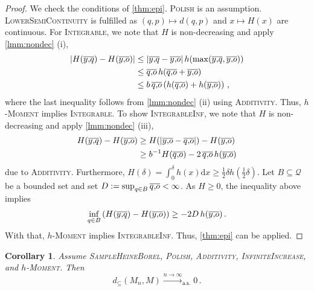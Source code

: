 \documentclass{scrartcl}
\renewcommand{\subset}{\subseteq}
\newcommand*{\mc}[1]{\mathcal{#1}}
\newcommand*{\ms}[1]{\mathsf{#1}}
\newcommand{\dl}{\mathrm{d}}
\newcommand{\equationFullstop}{\, .}
\newcommand{\eqfs}{\equationFullstop}
\newcommand{\equationComma}{\, ,}
\newcommand{\eqcm}{\equationComma}
\theoremstyle{plain}\newtheorem{theorem}{Theorem}[section]
\newtheorem{corollary}[theorem]{Corollary}
\theoremstyle{definition}
\theoremstyle{remark}
\begin{document}
\begin{proof}
	We check the conditions of \autoref{thm:epi}. \textsc{Polish} is an assumption. 
	\textsc{LowerSemiContinuity} is fulfilled as $(q,p)\mapsto d(q,p)$ and $x \mapsto H(x)$ are continuous.
	For \textsc{Integrable}, we note that $H$ is non-decreasing and apply \autoref{lmm:nondec} (i),
	\begin{align*}
		\abs{H(\ol yq) - H(\ol yo)} 
		&\leq 
		\abs{\ol yq - \ol yo} h\brOf{\max(\ol yq, \ol yo)}
		\\&\leq 
		\ol qo\, h(\ol qo + \ol yo)
		\\&\leq 
		b\, \ol qo \br{h(\ol qo) + h(\ol yo)}
		\eqcm
	\end{align*}
	where the last inequality follows from \autoref{lmm:nondec} (ii) using \textsc{Additivity}.
	Thus, \textsc{$h$-Moment} implies \textsc{Integrable}.
	To show \textsc{IntegrableInf}, we note that $H$ is non-decreasing and apply \autoref{lmm:nondec} (iii),
	\begin{align*}
		H(\ol yq) - H(\ol yo)
		&\geq 
		H(\abs{\ol yo - \ol qo}) - H(\ol yo)
		\\&\geq 
		b^{-1} H( \ol qo) - 2  \,\ol qo\, h( \ol yo)
	\end{align*}
	due to \textsc{Additivity}. Furthermore, $H(\delta)  = \int_0^\delta h(x) \dl x \geq \frac12 \delta h(\frac12 \delta)$.
	Let $B \subset \mc Q$ be a bounded set and set $D := \sup_{q\in B} \overline{q,\!o} < \infty$. As $H \geq 0$, the inequality above implies
	\begin{equation*}
		\inf_{q \in B} \br{H(\ol yq) - H(\ol yo)} \geq - 2 D\, h(\ol yo)
		\eqfs
	\end{equation*}
	With that, \textsc{$h$-Moment} implies \textsc{IntegrableInf}.
	Thus, \autoref{thm:epi} can be applied.
\end{proof}
\begin{corollary}\label{cor:nondec:onehaus}
	Assume \textsc{SampleHeineBorel}, \textsc{Polish}, \textsc{Additivity}, \textsc{InfiniteIncrease}, and \textsc{$h$-Moment}.
	Then
	\begin{equation*}
		d_\subset(M_n, M) \xrightarrow{n\to\infty}_{\ms{a.s.}} 0
		\eqfs
	\end{equation*}
\end{corollary}
\end{document}
